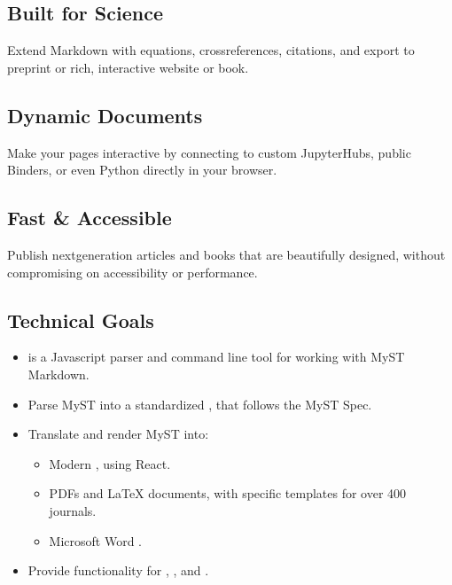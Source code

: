 \documentclass[letterpaper,12pt,english]{sphinxmanual}
\begin{document}
\subsection{Built for Science}
\label{\detokenize{notebooks/02-myst.integration:built-for-science}}
\sphinxAtStartPar
Extend Markdown with equations, cross\sphinxhyphen{}references, citations, and export to preprint or rich, interactive website or book.


\subsection{Dynamic Documents}
\label{\detokenize{notebooks/02-myst.integration:dynamic-documents}}
\sphinxAtStartPar
Make your pages interactive by connecting to custom JupyterHubs, public Binders, or even Python directly in your browser.


\subsection{Fast \& Accessible}
\label{\detokenize{notebooks/02-myst.integration:fast-accessible}}
\sphinxAtStartPar
Publish next\sphinxhyphen{}generation articles and books that are beautifully designed, without compromising on accessibility or performance.


\subsection{Technical Goals}
\label{\detokenize{notebooks/02-myst.integration:technical-goals}}\begin{itemize}
\item {} 
\sphinxAtStartPar
{} is a Javascript parser and command line tool for working with MyST Markdown.

\item {} 
\sphinxAtStartPar
Parse MyST into a standardized , that follows the MyST Spec.

\item {} 
\sphinxAtStartPar
Translate and render MyST into:
\begin{itemize}
\item {} 
\sphinxAtStartPar
Modern , using React.

\item {} 
\sphinxAtStartPar
PDFs and LaTeX documents, with specific templates for over 400 journals.

\item {} 
\sphinxAtStartPar
Microsoft Word .

\end{itemize}

\item {} 
\sphinxAtStartPar
Provide functionality for , , and .

\end{itemize}
\end{document}
